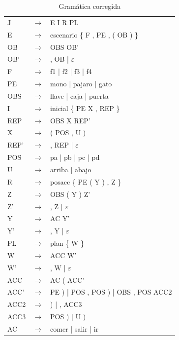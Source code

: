 \documentclass[11pt,a4paper,spanish,twoside]{book}
\theoremstyle{plain} \newtheorem{nota}{Nota}
\begin{document}
\begin{table}[!ht]
  \centering
  \begin{tabular}{lll}
    \hline
    J    & $\to$ & E I R PL\\
    E    & $\to$ & escenario \{ F , PE , ( OB ) \}\\
    OB   & $\to$ & OBS OB'\\
    OB'  & $\to$ & , OB | $\varepsilon$\\
    F    & $\to$ & f1 | f2 | f3 | f4\\
    PE   & $\to$ & mono | pajaro | gato\\
    OBS  & $\to$ & llave | caja | puerta\\
    I    & $\to$ & inicial \{ PE X , REP \}\\
    REP  & $\to$ & OBS X REP'\\
    X    & $\to$ & ( POS , U )\\
    REP' & $\to$ & , REP | $\varepsilon$\\
    POS  & $\to$ & pa | pb | pc | pd\\
    U    & $\to$ & arriba | abajo\\
    R    & $\to$ & posacc \{ PE ( Y ) , Z \}\\
    Z    & $\to$ & OBS ( Y ) Z'\\
    Z'   & $\to$ & , Z | $\varepsilon$\\
    Y    & $\to$ & AC Y'\\
    Y'   & $\to$ & , Y | $\varepsilon$\\
    PL   & $\to$ & plan \{ W \}\\
    W    & $\to$ & ACC W'\\
    W'   & $\to$ & , W | $\varepsilon$\\
    ACC  & $\to$ & AC ( ACC'\\
    ACC' & $\to$ & PE ) | POS , POS ) | OBS , POS ACC2\\
    ACC2 & $\to$ & ) | , ACC3\\
    ACC3 & $\to$ & POS ) | U )\\
    AC   & $\to$ & comer | salir | ir\\
    \hline
  \end{tabular}
  \caption{Gramática corregida}\label{GC}
\end{table}
\end{document}
